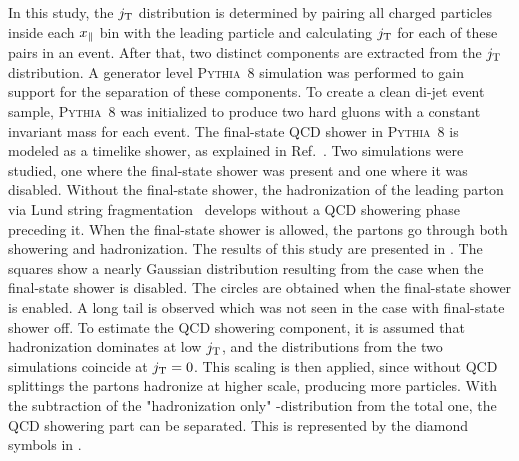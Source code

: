 In this study, the $j_{\rm T}$ distribution is determined by pairing all charged particles inside each $x_{\parallel}$ bin with the leading particle and calculating $j_{\rm T}$ for each of these pairs in an event. After that, two distinct components are extracted from the $j_{\rm T}$ distribution. A generator level \textsc{Pythia}~8 simulation was performed to gain support for the separation of these components. To create a clean di-jet event sample, \textsc{Pythia}~8 was initialized to produce two hard gluons with a constant invariant mass for each event. The final-state QCD shower in \textsc{Pythia}~8 is modeled as a timelike shower, as explained in Ref.~\cite{newPythiaShower}. Two simulations were studied, one where the final-state shower was present and one where it was disabled. Without the final-state shower, the hadronization of the leading parton via Lund string fragmentation~\cite{lundString} develops without a QCD showering phase preceding it. When the final-state shower is allowed, the partons go through both showering and hadronization. The results of this study are presented in . The squares show a nearly Gaussian distribution resulting from the case when the final-state shower is disabled. The circles are obtained when the final-state shower is enabled. A long tail is observed which was not seen in the case with final-state shower off. To estimate the QCD showering component, it is assumed that hadronization dominates at low $j_{\rm T}$, and the distributions from the two simulations coincide at $j_{\rm T} = 0$. This scaling is then applied, since without QCD splittings the partons hadronize at higher scale, producing more particles. With the subtraction of the "hadronization only" -distribution from the total one, the QCD showering part can be separated. This is represented by the diamond symbols in .
  
